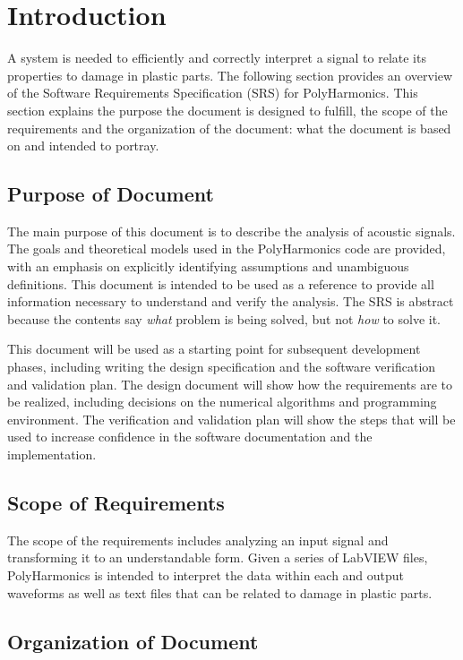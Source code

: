 \documentclass[12pt]{article}
\newcommand{\progname}{PolyHarmonics}
\begin{document}
\section{Introduction}

A system is needed to efficiently and correctly interpret a signal to relate its 
properties to damage in plastic parts.
The following section provides an overview of the Software Requirements
Specification (SRS) for \progname.
This section explains the purpose the document is designed to fulfill, the scope 
of the requirements and the organization of the document: what the document is 
based on and intended to portray.

\subsection{Purpose of Document}

The main purpose of this document is to describe the analysis of acoustic 
signals.
The goals and theoretical models used in the 
\progname{} code are provided, with an emphasis on explicitly identifying 
assumptions and unambiguous definitions.  This document is intended to be used 
as a reference to provide all information necessary to 
understand and verify the analysis.  The SRS is abstract because the contents 
say
\emph{what} problem is being solved, but not \emph{how} to solve it.

This document will be used as a starting point for subsequent development
phases, including writing the design specification and the software verification
and validation plan.  The design document will show how the requirements are to
be realized, including decisions on the numerical algorithms and programming
environment.  The verification and validation plan will show the steps that will
be used to increase confidence in the software documentation and the
implementation.  

\subsection{Scope of Requirements} 

The scope of the requirements includes analyzing an input signal and
transforming it to an understandable form. Given a series of LabVIEW files, 
\progname{} is intended to interpret the data within each and output  
waveforms as well as text files that can be related to damage in plastic parts.

\subsection{Organization of Document}
\end{document}
